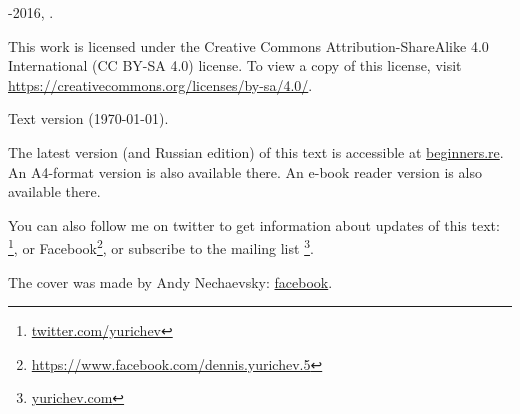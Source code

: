 ﻿\begin{titlepage}


\end{titlepage}

\newpage

\begin{center}
\vspace*{\fill}
{\LARGE \TITLE}

\vspace*{\fill}

{\large \AUTHOR}

{\large \TT{<\EMAIL>}}
\vspace*{\fill}
\vfill

\ccbysa

-2016, \AUTHOR. 

This work is licensed under the Creative Commons Attribution-ShareAlike 4.0 International (CC BY-SA 4.0) license.
To view a copy of this license, visit \url{https://creativecommons.org/licenses/by-sa/4.0/}.

Text version ({\large \today}).

The latest version (and Russian edition) of this text is accessible at \href{http://go.yurichev.com/17009}{beginners.re}.
\ifdefined\ebook
An A4-format version is also available there.
\else
An e-book reader version is also available there.
\fi

You can also follow me on twitter to get information about updates of this text:
\footnote{\href{http://go.yurichev.com/17021}{twitter.com/yurichev}},
or Facebook\footnote{\url{https://www.facebook.com/dennis.yurichev.5}},
or subscribe to the mailing list
\footnote{\href{http://go.yurichev.com/17020}{yurichev.com}}.

The cover was made by Andy Nechaevsky: \href{http://go.yurichev.com/17023}{facebook}.

\end{center}
